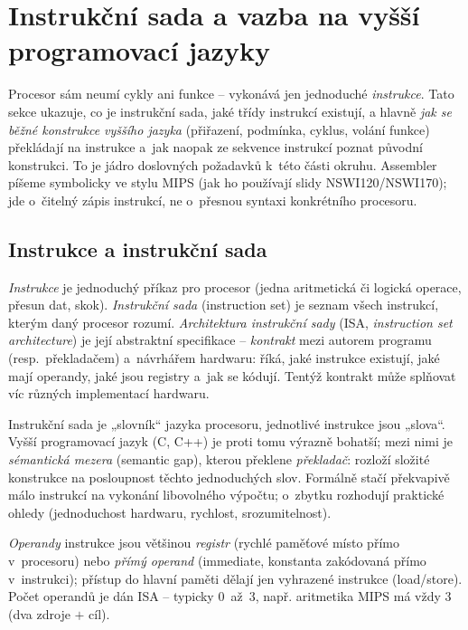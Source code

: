 \section{Instrukční sada a vazba na vyšší programovací jazyky}

Procesor sám neumí cykly ani funkce -- vykonává jen jednoduché \emph{instrukce}. Tato sekce ukazuje, co je instrukční sada, jaké třídy instrukcí existují, a hlavně \emph{jak se běžné konstrukce vyššího jazyka} (přiřazení, podmínka, cyklus, volání funkce) překládají na instrukce a~jak naopak ze sekvence instrukcí poznat původní konstrukci. To je jádro doslovných požadavků k~této části okruhu. Assembler píšeme symbolicky ve stylu MIPS (jak ho používají slidy NSWI120/NSWI170); jde o~čitelný zápis instrukcí, ne o~přesnou syntaxi konkrétního procesoru.

\subsection{Instrukce a instrukční sada}

\begin{definice}
\emph{Instrukce} je jednoduchý příkaz pro procesor (jedna aritmetická či logická operace, přesun dat, skok). \emph{Instrukční sada} (instruction set) je seznam všech instrukcí, kterým daný procesor rozumí. \emph{Architektura instrukční sady} (ISA, \emph{instruction set architecture}) je její abstraktní specifikace -- \emph{kontrakt} mezi autorem programu (resp.\ překladačem) a~návrhářem hardwaru: říká, jaké instrukce existují, jaké mají operandy, jaké jsou registry a~jak se kódují. Tentýž kontrakt může splňovat víc různých implementací hardwaru.
\end{definice}

\begin{intuice}
Instrukční sada je „slovník`` jazyka procesoru, jednotlivé instrukce jsou „slova``. Vyšší programovací jazyk (C, C++) je proti tomu výrazně bohatší; mezi nimi je \emph{sémantická mezera} (semantic gap), kterou překlene \emph{překladač}: rozloží složité konstrukce na posloupnost těchto jednoduchých slov. Formálně stačí překvapivě málo instrukcí na vykonání libovolného výpočtu; o~zbytku rozhodují praktické ohledy (jednoduchost hardwaru, rychlost, srozumitelnost).
\end{intuice}

\emph{Operandy} instrukce jsou většinou \emph{registr} (rychlé paměťové místo přímo v~procesoru) nebo \emph{přímý operand} (immediate, konstanta zakódovaná přímo v~instrukci); přístup do hlavní paměti dělají jen vyhrazené instrukce (load/store). Počet operandů je dán ISA -- typicky 0~až~3, např. aritmetika MIPS má vždy 3 (dva zdroje $+$ cíl).

